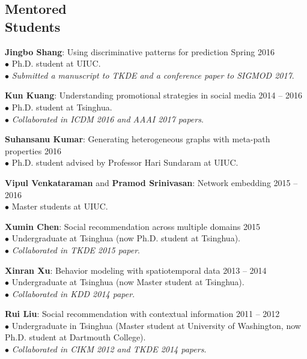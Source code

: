 \documentclass[margin, 10pt]{res}
\begin{document}
\begin{resume}
\section{Mentored \\ Students}

{\textbf{Jingbo Shang}: Using discriminative patterns for prediction} \hfill{Spring 2016} \\
$\bullet$ Ph.D. student at UIUC. \\
$\bullet$ \textit{Submitted a manuscript to TKDE and a conference paper to SIGMOD 2017}.

{\textbf{Kun Kuang}: Understanding promotional strategies in social media} \hfill{2014 -- 2016} \\
$\bullet$ Ph.D. student at Tsinghua. \\
$\bullet$ \textit{Collaborated in ICDM 2016 and AAAI 2017 papers}.

{\textbf{Suhansanu Kumar}: Generating heterogeneous graphs with meta-path properties} \hfill{2016} \\
$\bullet$ Ph.D. student advised by Professor Hari Sundaram at UIUC.

{\textbf{Vipul Venkataraman} and \textbf{Pramod Srinivasan}: Network embedding} \hfill{2015 -- 2016} \\
$\bullet$ Master students at UIUC.

{\textbf{Xumin Chen}: Social recommendation across multiple domains} \hfill{2015} \\
$\bullet$ Undergraduate at Tsinghua (now Ph.D. student at Tsinghua). \\
$\bullet$ \textit{Collaborated in TKDE 2015 paper}.

{\textbf{Xinran Xu}: Behavior modeling with spatiotemporal data} \hfill{2013 -- 2014} \\
$\bullet$ Undergraduate at Tsinghua (now Master student at Tsinghua). \\
$\bullet$ \textit{Collaborated in KDD 2014 paper}.

{\textbf{Rui Liu}: Social recommendation with contextual information} \hfill{2011 -- 2012} \\
$\bullet$ Undergraduate in Tsinghua (Master student at University of Washington, now Ph.D. student at Dartmouth College). \\
$\bullet$ \textit{Collaborated in CIKM 2012 and TKDE 2014 papers}.


\end{resume}
\end{document}
